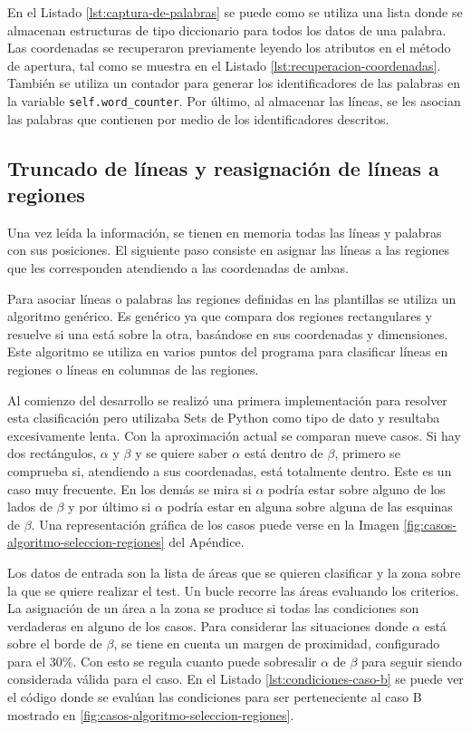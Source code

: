 En el Listado \ref{lst:captura-de-palabras} se puede como se utiliza una lista donde se almacenan estructuras de tipo diccionario para todos los datos de una palabra. Las coordenadas se recuperaron previamente leyendo los atributos en el método de apertura, tal como se muestra en el Listado \ref{lst:recuperacion-coordenadas}. También se utiliza un contador para generar los identificadores de las palabras en la variable \verb|self.word_counter|. Por último, al almacenar las líneas, se les asocian las palabras que contienen por medio de los identificadores descritos. 

\subsection{Truncado de líneas y reasignación de líneas a regiones}

Una vez leída la información, se tienen en memoria todas las líneas y palabras con sus posiciones. El siguiente paso consiste en asignar las líneas a las regiones que les corresponden atendiendo a las coordenadas de ambas.

Para asociar líneas o palabras las regiones definidas en las plantillas se utiliza un algoritmo genérico. Es genérico ya que compara dos regiones rectangulares y resuelve si una está sobre la otra, basándose en sus coordenadas y dimensiones. Este algoritmo se utiliza en varios puntos del programa para clasificar líneas en regiones o líneas en columnas de las regiones.

Al comienzo del desarrollo se realizó una primera implementación para resolver esta clasificación pero utilizaba Sets de Python como tipo de dato y resultaba excesivamente lenta. Con la aproximación actual se comparan nueve casos. Si hay dos rectángulos, $ \alpha $ y $ \beta $ y se quiere saber $ \alpha $ está dentro de $ \beta $, primero se comprueba si, atendiendo a sus coordenadas, está totalmente dentro. Este es un caso muy frecuente. En los demás se mira si $ \alpha $ podría estar sobre alguno de los lados de $ \beta $ y por último si $ \alpha $ podría estar en alguna sobre alguna de las esquinas de $ \beta $. Una representación gráfica de los casos puede verse en la Imagen \ref{fig:casos-algoritmo-seleccion-regiones} del Apéndice. 

Los datos de entrada son la lista de áreas que se quieren clasificar y la zona sobre la que se quiere realizar el test. Un bucle recorre las áreas evaluando los criterios. La asignación de un área a la zona se produce si todas las condiciones son verdaderas en alguno de los casos. Para considerar las situaciones donde $ \alpha $ está sobre el borde de $ \beta $, se tiene en cuenta un margen de proximidad, configurado para el $ 30\% $. Con esto se regula cuanto puede sobresalir $ \alpha $ de $ \beta $ para seguir siendo considerada válida para el caso. En el Listado \ref{lst:condiciones-caso-b} se puede ver el código donde se evalúan las condiciones para ser perteneciente al caso B mostrado en \ref{fig:casos-algoritmo-seleccion-regiones}.

